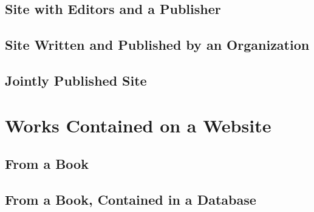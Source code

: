 \documentclass{article}
\begin{document}
\subsection{Site with Editors and a Publisher} %
\label{sub:site_with_editors_and_a_publisher}
\begin{refsection}
	\printbibliography[heading=none]
\end{refsection}
\subsection{Site Written and Published by an Organization} %
\label{sub:site_written_and_published_by_an_organization}
\begin{refsection}
	\printbibliography[heading=none]
\end{refsection}
\subsection{Jointly Published Site} %
\label{sub:jointly_published_site}
\begin{refsection}
	\printbibliography[heading=none]
\end{refsection}

\section{Works Contained on a Website} %
\label{sec:works_contained_on_a_website}
\subsection{From a Book} %
\label{sub:from_a_book}
\begin{refsection}
	\printbibliography[heading=none]
\end{refsection}
\subsection{From a Book, Contained in a Database} %
\label{sub:from_a_book_contained_in_a_database}
\begin{refsection}
	\printbibliography[heading=none]
\end{refsection}
\end{document}
